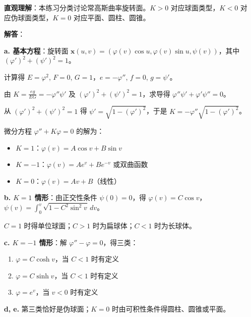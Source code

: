 \begin{solution}
\textbf{直观理解}：本练习分类讨论常高斯曲率旋转面。$K > 0$ 对应球面类型，$K < 0$ 对应伪球面类型，$K = 0$ 对应平面、圆柱、圆锥。

\textbf{解答}：

\textbf{a. 基本方程}：旋转面 $\mathbf{x}(u,v) = (\varphi(v)\cos u, \varphi(v)\sin u, \psi(v))$，其中 $(\varphi')^2 + (\psi')^2 = 1$。

计算得 $E = \varphi^2$, $F = 0$, $G = 1$，$e = -\varphi''$, $f = 0$, $g = \psi'$。

由 $K = \frac{eg}{EG} = -\varphi''\psi'$ 及 $(\varphi')^2 + (\psi')^2 = 1$，求导得 $\varphi''\psi' + \varphi'\psi'' = 0$。

从 $(\varphi')^2 + (\psi')^2 = 1$ 得 $\psi' = \sqrt{1-(\varphi')^2}$，于是 $K = -\varphi''\sqrt{1-(\varphi')^2}$。

微分方程 $\varphi'' + K\varphi = 0$ 的解为：
\begin{itemize}
\item $K = 1$：$\varphi(v) = A\cos v + B\sin v$
\item $K = -1$：$\varphi(v) = A e^v + Be^{-v}$ 或双曲函数
\item $K = 0$：$\varphi(v) = Av + B$（线性）
\end{itemize}

\textbf{b. $K = 1$ 情形}：由正交性条件 $\psi(0) = 0$，得 $\varphi(v) = C\cos v$，$\psi(v) = \int_0^v\sqrt{1-C^2\sin^2 v}\,dv$。

$C = 1$ 时得单位球面；$C > 1$ 时为扁球体；$C < 1$ 时为长球体。

\textbf{c. $K = -1$ 情形}：解 $\varphi'' - \varphi = 0$，得三类：
\begin{enumerate}
\item $\varphi = C\cosh v$，当 $C < 1$ 时有定义
\item $\varphi = C\sinh v$，当 $C < 1$ 时有定义
\item $\varphi = e^v$，当 $v < 0$ 时有定义
\end{enumerate}

\textbf{d, e.} 第三类恰好是伪球面；$K = 0$ 时由可积性条件得圆柱、圆锥或平面。
\end{solution}

